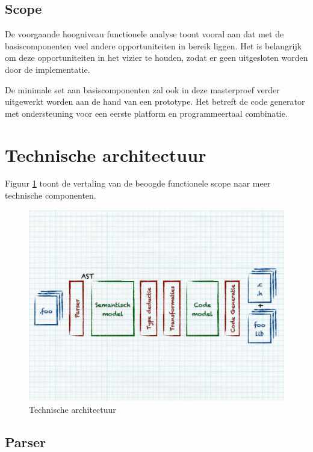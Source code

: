\subsection{Scope}
\label{subsection:arch-scope}

De voorgaande hoogniveau functionele analyse toont vooral aan dat met de
basiscomponenten veel andere opportuniteiten in bereik liggen. Het is
belangrijk om deze opportuniteiten in het vizier te houden, zodat er geen
uitgesloten worden door de implementatie.

De minimale set aan basiscomponenten zal ook in deze masterproef verder
uitgewerkt worden aan de hand van een prototype. Het betreft de code generator
met ondersteuning voor een eerste platform en programmeertaal combinatie.

\section{Technische architectuur}
\label{section:arch-technical}

Figuur \ref{fig:arch-technical} toont de vertaling van de beoogde functionele
scope naar meer technische componenten. 

\begin{figure}[ht]
  \centering
  \includegraphics[width=0.9\linewidth]{resources/arch-technical.pdf}
  \caption{Technische architectuur}
  \label{fig:arch-technical}
\end{figure}

\subsection{Parser}

